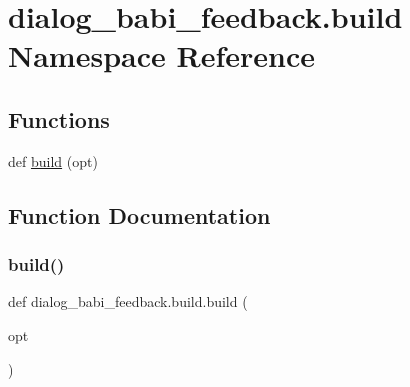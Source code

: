 \hypertarget{namespacedialog__babi__feedback_1_1build}{}\section{dialog\+\_\+babi\+\_\+feedback.\+build Namespace Reference}
\label{namespacedialog__babi__feedback_1_1build}
\subsection*{Functions}
\begin{DoxyCompactItemize}
\item 
def \hyperlink{namespacedialog__babi__feedback_1_1build_a7a9d289f7493a5ded13c4b7f071b6184}{build} (opt)
\end{DoxyCompactItemize}


\subsection{Function Documentation}
\mbox{\label{namespacedialog__babi__feedback_1_1build_a7a9d289f7493a5ded13c4b7f071b6184}} 
\subsubsection{\texorpdfstring{build()}{build()}}
{\footnotesize\ttfamily def dialog\+\_\+babi\+\_\+feedback.\+build.\+build (\begin{DoxyParamCaption}\item[{}]{opt }\end{DoxyParamCaption})}

